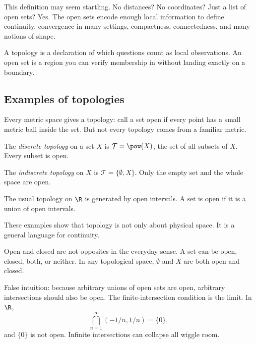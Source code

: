 This definition may seem startling. No distances? No coordinates? Just a list
of open sets? Yes. The open sets encode enough local information to define
continuity, convergence in many settings, compactness, connectedness, and many
notions of shape.

\begin{intuitionbox}
A topology is a declaration of which questions count as local observations. An
open set is a region you can verify membership in without landing exactly on a
boundary.
\end{intuitionbox}

\subsection{Examples of topologies}

Every metric space gives a topology: call a set open if every point has a small
metric ball inside the set. But not every topology comes from a familiar metric.

\begin{example}
The \emph{discrete topology} on a set $X$ is $\mathcal{T}=\pow(X)$, the set of
all subsets of $X$. Every subset is open.
\end{example}

\begin{example}
The \emph{indiscrete topology} on $X$ is $\mathcal{T}=\{\emptyset,X\}$. Only the
empty set and the whole space are open.
\end{example}

\begin{example}
The usual topology on $\R$ is generated by open intervals. A set is open if it
is a union of open intervals.
\end{example}

These examples show that topology is not only about physical space. It is a
general language for continuity.

\begin{trapbox}
Open and closed are not opposites in the everyday sense. A set can be open,
closed, both, or neither. In any topological space, $\emptyset$ and $X$ are both
open and closed.
\end{trapbox}

\begin{trapbox}
False intuition: because arbitrary unions of open sets are open, arbitrary
intersections should also be open. The finite-intersection condition is the
limit. In $\R$,
\[
\bigcap_{n=1}^{\infty}(-1/n,1/n)=\{0\},
\]
and $\{0\}$ is not open. Infinite intersections can collapse all wiggle room.
\end{trapbox}

